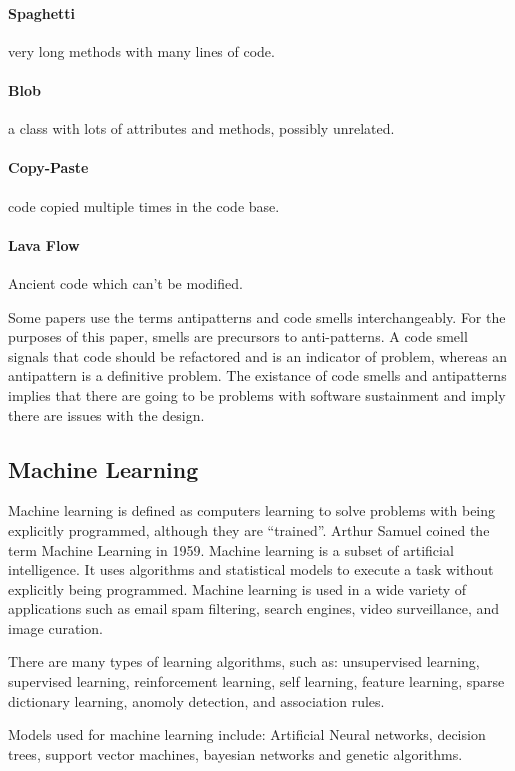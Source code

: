 \documentclass[conference]{IEEEtran}
\begin{document}
\paragraph{Spaghetti} very long methods with many lines of code.
\paragraph{Blob} a class with lots of attributes and methods, possibly unrelated.
\paragraph{Copy-Paste} code copied multiple times in the code base.
\paragraph{Lava Flow} Ancient code which can't be modified.

Some papers use the terms antipatterns and code smells interchangeably\cite{singh_systematic_2018}. 
For the purposes of this paper, smells are precursors to anti-patterns. 
A code smell signals that code should be refactored and is an indicator of problem, whereas an antipattern is a definitive problem. 
The existance of code smells and antipatterns implies that there are going to be problems with software sustainment and imply there are issues with the design.


\subsection{Machine Learning}
Machine learning is defined as computers learning to solve problems with being explicitly programmed, although they are ``trained''\cite{bishop_pattern_2006}. 
Arthur Samuel coined the term Machine Learning in 1959\cite{samuel_studies_1988}.
Machine learning is a subset of artificial intelligence. 
It uses algorithms and statistical models to execute a task without explicitly being programmed.
Machine learning is used in a wide variety of applications such as email spam filtering, search engines, video surveillance, and image curation.

There are many types of learning algorithms, such as: unsupervised learning, supervised learning, reinforcement learning, self learning, feature learning, sparse dictionary learning, anomoly detection, and association rules.

Models used for machine learning include: Artificial Neural networks, decision trees, support vector machines, bayesian networks and genetic algorithms.
\end{document}
